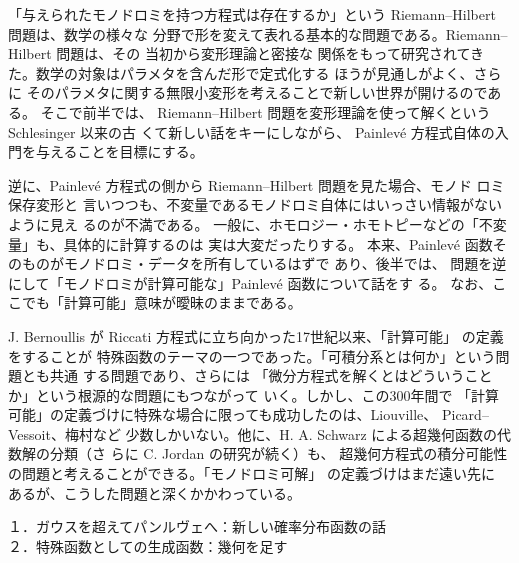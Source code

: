 \documentclass[uplatex,dvipdfmx]{jlreq}
\begin{document}
\vspace*{18pt}

「与えられたモノドロミを持つ方程式は存在するか」という Riemann--Hilbert
問題は、数学の様々な
分野で形を変えて表れる基本的な問題である。Riemann--Hilbert 問題は、その
当初から変形理論と密接な
関係をもって研究されてきた。数学の対象はパラメタを含んだ形で定式化する
ほうが見通しがよく、さらに
そのパラメタに関する無限小変形を考えることで新しい世界が開けるのである。
そこで前半では、
Riemann--Hilbert 問題を変形理論を使って解くという Schlesinger 以来の古
くて新しい話をキーにしながら、
Painlevé 方程式自体の入門を与えることを目標にする。

逆に、Painlevé 方程式の側から Riemann--Hilbert 問題を見た場合、モノド
ロミ保存変形と
言いつつも、不変量であるモノドロミ自体にはいっさい情報がないように見え
るのが不満である。
一般に、ホモロジー・ホモトピーなどの「不変量」も、具体的に計算するのは
実は大変だったりする。
本来、Painlevé 函数そのものがモノドロミ・データを所有しているはずで
あり、後半では、
問題を逆にして「モノドロミが計算可能な」Painlevé 函数について話をす
る。
なお、ここでも「計算可能」意味が曖昧のままである。

J. Bernoullis が Riccati 方程式に立ち向かった17世紀以来、「計算可能」
の定義をすることが
特殊函数のテーマの一つであった。「可積分系とは何か」という問題とも共通
する問題であり、さらには
「微分方程式を解くとはどういうことか」という根源的な問題にもつながって
いく。しかし、この300年間で
「計算可能」の定義づけに特殊な場合に限っても成功したのは、Liouville、
Picard--Vessoit、梅村など
少数しかいない。他に、H. A. Schwarz による超幾何函数の代数解の分類（さ
らに C. Jordan の研究が続く）も、
超幾何方程式の積分可能性の問題と考えることができる。「モノドロミ可解」
の定義づけはまだ遠い先に
あるが、こうした問題と深くかかわっている。

\vspace*{24pt}

\newpage


\begin{center}
１．ガウスを超えてパンルヴェへ：新しい確率分布函数の話\\
２．特殊函数としての生成函数：幾何を足す\\[6pt]
\hspace*{\fill}{\large\bfseries 村瀬 元彦（UC Davis）}
\end{center}
\end{document}
